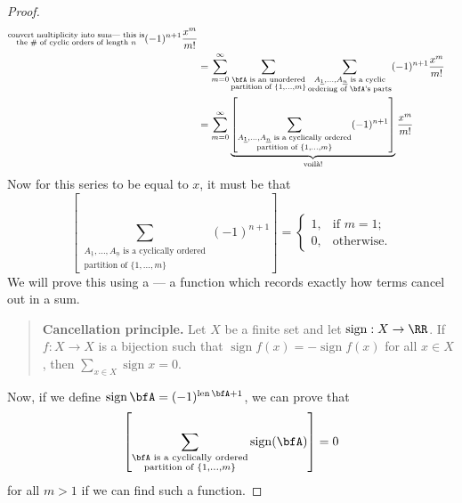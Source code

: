 \documentclass{article}
\DeclareMathOperator{\sign}{sign}
\DeclareMathOperator{\len}{len}
\begin{document}
\begin{proof}
\begin{align*}
{            \substack{
                \text{convert multiplicity into sum--- this is} \\
                \text{the \# of cyclic orders of length $n$}
            }
        }
        (-1)^{n+1}
        \frac{x^m}{m!}
        \\
        &=
        \sum_{m=0}^\infty
        \sum_{
            \substack{
                \bfA \text{ is an unordered} \\
                \text{partition of }\{1,\ldots,m\}
            }
        }
        \sum_{
            \substack{
                A_{\underline{1}},\ldots,A_{\underline{n}}\text{ is a cyclic} \\
                \text{ordering of $\bfA$'s parts}
            }
        }
        (-1)^{n+1}
        \frac{x^m}{m!}
        \\
        &=
        \sum_{m=0}^\infty
        \underbrace{
            \left[
                \sum_{
                    \substack{
                        A_{\underline{1}},\ldots,A_{\underline{n}} \text{ is a cyclically ordered} \\
                        \text{partition of }\{1,\ldots,m\}
                    }
                }
                (-1)^{n+1}
            \right]
        }_{\text{voil\`a!}}
        \frac{x^m}{m!}
    \end{align*}
    Now for this series to be equal to $x$, it must be that
    \[
        \left[
            \sum_{
                \substack{
                    A_{\underline{1}},\ldots,A_{\underline{n}} \text{ is a cyclically ordered} \\
                    \text{partition of }\{1,\ldots,m\}
                }
            }
            (-1)^{n+1}
        \right]
        =
        \begin{cases}
            1, & \text{if } m=1; \\
            0, & \text{otherwise}.
        \end{cases}
    \]
    We will prove this using a --- a function which records exactly how terms cancel out in a sum.
    \begin{quote}
        \textbf{Cancellation principle.}
        Let $X$ be a finite set and let $\sign: X \to \RR$.
        If $f: X \to X$ is a bijection such that $\sign f(x) = -\sign f(x)$ for all $x \in X$, then $\sum_{x \in X} \sign x = 0$.
    \end{quote}

    Now, if we define $\sign \bfA = (-1)^{\len \bfA + 1}$, we can prove that
    \[
        \left[
            \sum_{
                \substack{
                    \bfA \text{ is a cyclically ordered} \\
                    \text{partition of }\{1,\ldots,m\}
                }
            }
            \sign(\bfA)
        \right]
        =
        0
    \]
    for all $m > 1$ if we can find such a function.


\end{proof}
\end{document}
